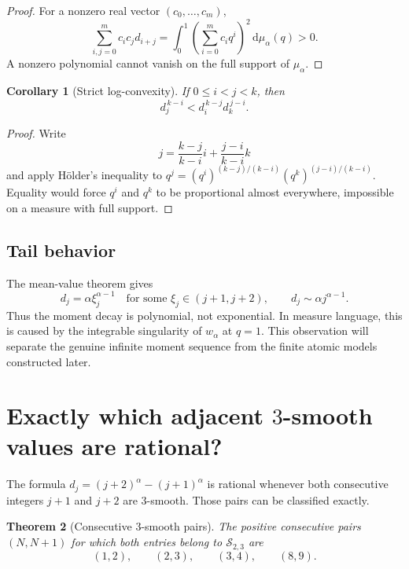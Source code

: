 \documentclass[11pt,oneside]{article}
\newtheorem{theorem}{Theorem}[section]
\newtheorem{corollary}[theorem]{Corollary}
\theoremstyle{definition}
\theoremstyle{remark}
\newcommand{\Ssmooth}{\mathcal S_{2,3}}
\newcommand{\dd}{\,\mathrm d}
\begin{document}
\begin{proof}
For a nonzero real vector $(c_0,\ldots,c_m)$,
\[
 \sum_{i,j=0}^m c_ic_jd_{i+j}
 =\int_0^1\left(\sum_{i=0}^mc_iq^i\right)^2\dd\mu_\alpha(q)>0.
\]
A nonzero polynomial cannot vanish on the full support of $\mu_\alpha$.
\end{proof}

\begin{corollary}[Strict log-convexity]\label{cor:logconvex}
If $0\le i<j<k$, then
\begin{equation}\label{eq:logconvex-general}
 d_j^{\,k-i}<d_i^{\,k-j}d_k^{\,j-i}.
\end{equation}
\end{corollary}

\begin{proof}
Write
\[
 j=\frac{k-j}{k-i}i+\frac{j-i}{k-i}k
\]
and apply H\"older's inequality to
$q^j=(q^i)^{(k-j)/(k-i)}(q^k)^{(j-i)/(k-i)}$.  Equality would force $q^i$ and $q^k$ to be
proportional almost everywhere, impossible on a measure with full support.
\end{proof}

\subsection{Tail behavior}

The mean-value theorem gives
\begin{equation}\label{eq:tail}
 d_j=\alpha\xi_j^{\alpha-1}
 \quad\text{for some }\xi_j\in(j+1,j+2),
 \qquad
 d_j\sim\alpha j^{\alpha-1}.
\end{equation}
Thus the moment decay is polynomial, not exponential.  In measure language, this is caused by
the integrable singularity of $w_\alpha$ at $q=1$.  This observation will separate the genuine
infinite moment sequence from the finite atomic models constructed later.

\section{Exactly which adjacent \texorpdfstring{$3$}{3}-smooth values are rational?}

The formula $d_j=(j+2)^\alpha-(j+1)^\alpha$ is rational whenever both consecutive integers
$j+1$ and $j+2$ are $3$-smooth.  Those pairs can be classified exactly.

\begin{theorem}[Consecutive $3$-smooth pairs]\label{thm:consecutive-smooth}
The positive consecutive pairs $(N,N+1)$ for which both entries belong to $\Ssmooth$ are
\begin{equation}\label{eq:consecutive-list}
 (1,2),\qquad(2,3),\qquad(3,4),\qquad(8,9).
\end{equation}
\end{theorem}
\end{document}
